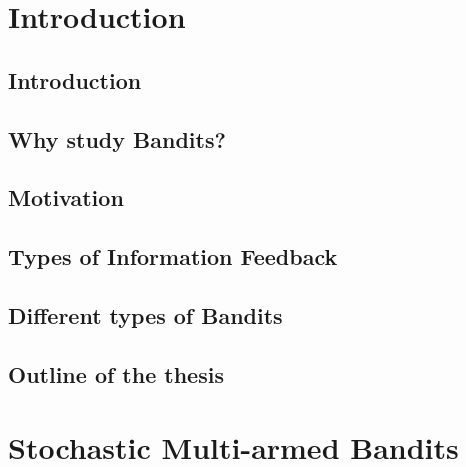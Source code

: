 \documentclass[MS]{iitmdiss}
\begin{document}
\pagebreak
\clearpage



\chapter{Introduction}
\label{chap:intro}

\section{Introduction}
\label{intro}


\section{Why study Bandits?}
\label{study}


\section{Motivation}
\label{motivation}



\section{Types of Information Feedback}
\label{feed}



\section{Different types of Bandits}
\label{types}


\section{Outline of the thesis}
\label{outline}





\chapter{Stochastic Multi-armed Bandits}
\label{chap:SMAB}
\end{document}
